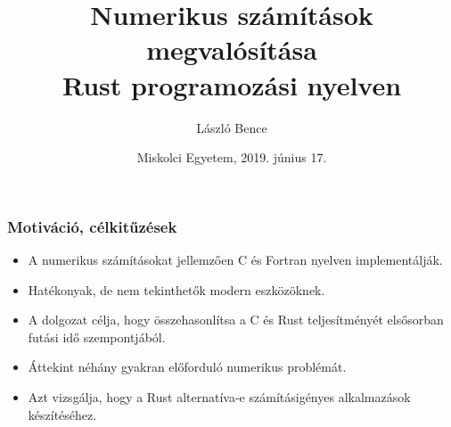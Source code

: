\documentclass{beamer}
\begin{document}

\title[Numerikus számítások megvalósítása Rust programozási nyelven]{
{\Large Numerikus számítások megvalósítása \\ Rust programozási nyelven}
}
\author[László Bence]{\Large László Bence}
\date{Miskolci Egyetem, 2019. június 17.}

\frame{\titlepage}

\begin{frame}[fragile]
\frametitle{Motiváció, célkitűzések}

\begin{itemize}
\item A numerikus számításokat jellemzően C és Fortran nyelven implementálják.
\item Hatékonyak, de nem tekinthetők modern eszközöknek.
\item A dolgozat célja, hogy összehasonlítsa a C és Rust teljesítményét elsősorban futási idő szempontjából.
\item Áttekint néhány gyakran előforduló numerikus problémát.
\item Azt vizsgálja, hogy a Rust alternatíva-e számításigényes alkalmazások készítéséhez.
\end{itemize}

\end{frame}
\end{document}
